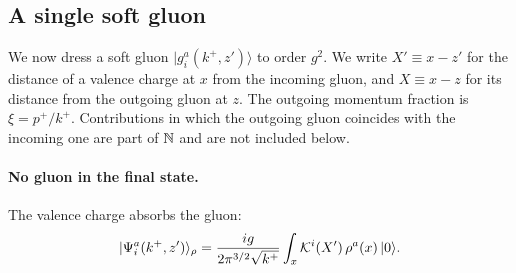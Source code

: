 \subsection{A single soft gluon}\label{sec:singleglue}

We now dress a soft gluon $|g^a_i(k^+,z')\rangle$ to order $g^2$. We write $X'\equiv x-z'$ for the distance of a valence charge at $x$ from the incoming gluon, and $X\equiv x-z$ for its distance from the outgoing gluon at $z$. The outgoing momentum fraction is $\xi=p^+/k^+$. Contributions in which the outgoing gluon coincides with the incoming one are part of $\mathbb{N}$ and are not included below.

\paragraph*{No gluon in the final state.} The valence charge absorbs the gluon:
\begin{equation}
|\Psi^a_i(k^+,z')\rangle_\rho=\frac{ig}{2\pi^{3/2}\sqrt{k^+}}\int_x\mathcal{K}^i(X')\,\rho^a(x)\,|0\rangle .
\label{eq:absorb}
\end{equation}


